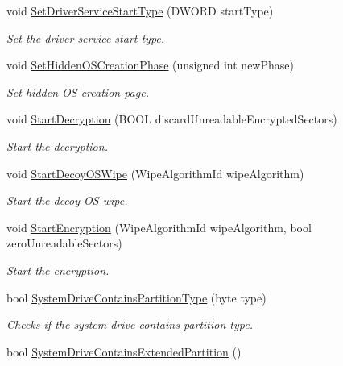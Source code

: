 \begin{DoxyCompactItemize}
void \hyperlink{class_gost_crypt_1_1_boot_encryption_ad66126952d3c90239d15fe53b98d98be}{Set\+Driver\+Service\+Start\+Type} (D\+W\+O\+RD start\+Type)
\begin{DoxyCompactList}\small\item\em Set the driver service start type. \end{DoxyCompactList}\item 
void \hyperlink{class_gost_crypt_1_1_boot_encryption_a06e9ef71b195c22837580dc678bb1e3f}{Set\+Hidden\+O\+S\+Creation\+Phase} (unsigned int new\+Phase)
\begin{DoxyCompactList}\small\item\em Set hidden OS creation page. \end{DoxyCompactList}\item 
void \hyperlink{class_gost_crypt_1_1_boot_encryption_a1397fa6ebb63da2ca0a636cfa8262858}{Start\+Decryption} (B\+O\+OL discard\+Unreadable\+Encrypted\+Sectors)
\begin{DoxyCompactList}\small\item\em Start the decryption. \end{DoxyCompactList}\item 
void \hyperlink{class_gost_crypt_1_1_boot_encryption_ae96eefda4ed624bd336f89b4a261b2c1}{Start\+Decoy\+O\+S\+Wipe} (Wipe\+Algorithm\+Id wipe\+Algorithm)
\begin{DoxyCompactList}\small\item\em Start the decoy OS wipe. \end{DoxyCompactList}\item 
void \hyperlink{class_gost_crypt_1_1_boot_encryption_a4dd591bdb27968b702694bcd7664e010}{Start\+Encryption} (Wipe\+Algorithm\+Id wipe\+Algorithm, bool zero\+Unreadable\+Sectors)
\begin{DoxyCompactList}\small\item\em Start the encryption. \end{DoxyCompactList}\item 
bool \hyperlink{class_gost_crypt_1_1_boot_encryption_a3638d4139eef90bc7f913fea8290e49e}{System\+Drive\+Contains\+Partition\+Type} (byte type)
\begin{DoxyCompactList}\small\item\em Checks if the system drive contains partition type. \end{DoxyCompactList}\item 
bool \hyperlink{class_gost_crypt_1_1_boot_encryption_aa761ac20523a11bf2b2915d4eb53af70}{System\+Drive\+Contains\+Extended\+Partition} ()

\end{DoxyCompactItemize}
